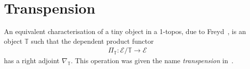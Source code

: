 \documentclass[10pt]{article}
\makeatletter
\theoremstyle{definition}
\let\oldequiv\equiv%
\renewcommand{\equiv}{\simeq}
\newcommand{\defeq}{\oldequiv}
\newcommand*{\univ}{\mathcal{U}}
\newcommand*{\code}{\mathsf{code}}
\newcommand*{\encode}{\mathsf{encode}}
\newcommand*{\decode}{\mathsf{decode}}
\def\prdsym{\prod}
\newcommand{\@theprd}[1]{\prdsym_{(#1)}}
\newcommand{\prd}[1]{\@ifnextchar\bgroup{\@prd{#1}\prd}{\@prd{#1}}}
\newcommand{\@prd}[1]{\mathchoice{{\textstyle\@theprd{#1}}}{\@theprd{#1}}{\@theprd{#1}}{\@theprd{#1}}}
\newcommand{\lock}{\mathchoice {\scalebox{0.8}{\text{\faLock}}}
  {\scalebox{0.8}{\text{\faLock}}} {\scalebox{0.5}{\text{\faLock}}}
  {\scalebox{0.4}{\text{\faLock}}} }
\newcommand{\key}{\mathchoice
  {\scalebox{0.8}{\text{\faKey}}} {\scalebox{0.8}{\text{\faKey}}}
  {\scalebox{0.5}{\text{\faKey}}} {\scalebox{0.4}{\text{\faKey}}} }
\newcommand{\rbindsym}{\raisebox{-0.5pt}{\scalerel*{\reflectbox{\rotatebox[origin=c]{185}{$\lambda$}}}{\lambda}}}
\newcommand{\Tiny}{\mathbb{T}}
\newcommand{\lockn}[1]{\mathcal{#1}}
\newcommand{\varkeye}[2]{\key_{#1}^{#2}}
\newcommand{\varkey}[2]{\varkeye{\lockn{#1}}{#2}}
\newcommand{\admkeye}[2]{\overrightarrow{\key}_{#1}^{#2}}
\newcommand{\admkey}[2]{\admkeye{\lockn{#1}}{#2}}
\newcommand{\rformsym}{\surd}
\newcommand{\rforme}[2]{\ThisStyle{\raisebox{0.07em}{$\SavedStyle \rformsym_{\hspace{-0.25em}#1}$}} #2}
\newcommand{\rform}[2]{\rforme{\lockn{#1}}{#2}}
\newcommand{\rformu}[1]{\ThisStyle{\raisebox{0.07em}{$\SavedStyle \rformsym$}} #1}
\newcommand{\rintroe}[2]{\lock_{#1}. #2}
\newcommand{\rintro}[2]{\rintroe{\lockn{#1}}{#2}}
\newcommand{\relim}[1]{\rbindsym #1}
\newcommand{\rget}[1]{{#1}_{\downharpoonleft}}
\makeatother
\begin{document}

\section{Transpension}\label{sec:transpension}

An equivalent characterisation of a tiny object in a 1-topos, due to
Freyd~\cite[Proposition 1.2]{yetter:tiny}, is an object $\Tiny$ such
that the dependent product functor
\begin{align*}
  \Pi_\Tiny : \mathcal{E}/\Tiny \to \mathcal{E}
\end{align*}
has a right adjoint $\nabla_\Tiny$. This operation was given the name \emph{transpension} in~\cite{dependable-atomicity, transpension}.
\end{document}
